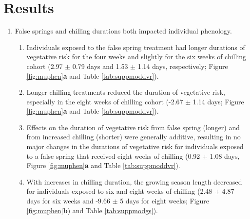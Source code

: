 \documentclass{article}\usepackage[]{graphicx}\usepackage[]{color}
\begin{document}
\section*{Results}
\begin{enumerate}
\item False springs and chilling durations both impacted individual phenology. 
  \begin{enumerate}
  \item Individuals exposed to the false spring treatment had longer durations of vegetative risk for the four weeks and slightly for the six weeks of chilling cohort (2.97 $\pm$ 0.79 days and 1.53 $\pm$ 1.14 days, respectively; Figure \ref{fig:muphen}\textbf{a} and Table \ref{tab:suppmoddvr}).
  \item Longer chilling treatments reduced the duration of vegetative risk, especially in the eight weeks of chilling cohort (-2.67 $\pm$ 1.14 days; Figure \ref{fig:muphen}\textbf{a} and Table \ref{tab:suppmoddvr}). %
  
  \item Effects on the duration of vegetative risk from false spring (longer) and from increased chilling (shorter) were generally additive, resulting in no major changes in the durations of vegetative risk for individuals exposed to a false spring that received eight weeks of chilling (0.92 $\pm$ 1.08 days, Figure \ref{fig:muphen}\textbf{a} and Table \ref{tab:suppmoddvr}). 
  \item With increases in chilling duration, the growing season length decreased for individuals exposed to six and eight weeks of chilling (2.48 $\pm$ 4.87 days for six weeks and -9.66 $\pm$ 5 days for eight weeks; Figure \ref{fig:muphen}\textbf{b}) and Table \ref{tab:suppmodgs}).
  \end{enumerate}
  

\end{enumerate}
\end{document}
